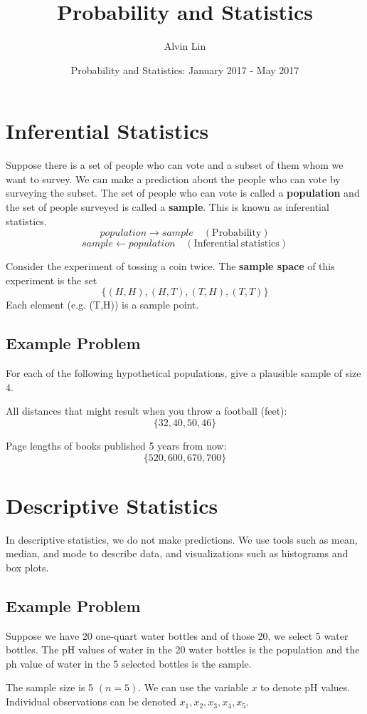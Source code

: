 \documentclass[letterpaper, 12pt]{article}
\title{Probability and Statistics}
\author{Alvin Lin}
\date{Probability and Statistics: January 2017 - May 2017}
\begin{document}
\maketitle

\section{Inferential Statistics}
Suppose there is a set of people who can vote and a subset of them
whom we want to survey. We can make a prediction about the people
who can vote by surveying the subset. The set of people who can
vote is called a \textbf{population} and the set of people surveyed
is called a \textbf{sample}. This is known as inferential statistics.
\[ population \to sample \quad \mathrm{(Probability)} \]
\[ sample \gets population \quad \mathrm{(Inferential\ statistics)} \]

Consider the experiment of tossing a coin twice. The
\textbf{sample space} of this experiment is the set
\[ \bigg\{ (H,H), (H,T), (T,H), (T,T) \bigg\} \]
Each element (e.g. (T,H)) is a sample point.

\subsection{Example Problem}
For each of the following hypothetical populations, give a plausible
sample of size 4.

All distances that might result when you throw a football (feet):
\[ \bigg\{ 32, 40, 50, 46 \bigg\} \]

Page lengths of books published 5 years from now:
\[ \bigg\{ 520, 600, 670, 700 \bigg\} \]

\section{Descriptive Statistics}
In descriptive statistics, we do not make predictions. We use tools such
as mean, median, and mode to describe data, and visualizations such as
histograms and box plots.

\subsection{Example Problem}
Suppose we have 20 one-quart water bottles and of those 20, we select 5
water bottles. The pH values of water in the 20 water bottles is the
population and the ph value of water in the 5 selected bottles is the sample.

The sample size is 5 \( (n = 5) \). We can use the variable \( x \) to denote
pH values. Individual observations can be denoted \( x_{1}, x_{2}, x_{3}, x_{4},
x_{5} \).
\end{document}

